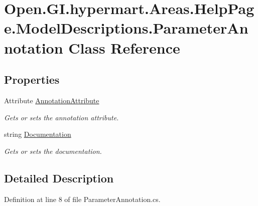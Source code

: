 \hypertarget{class_open_1_1_g_i_1_1hypermart_1_1_areas_1_1_help_page_1_1_model_descriptions_1_1_parameter_annotation}{}\section{Open.\+G\+I.\+hypermart.\+Areas.\+Help\+Page.\+Model\+Descriptions.\+Parameter\+Annotation Class Reference}
\label{class_open_1_1_g_i_1_1hypermart_1_1_areas_1_1_help_page_1_1_model_descriptions_1_1_parameter_annotation}


 


\subsection*{Properties}
\begin{DoxyCompactItemize}
\item 
Attribute \hyperlink{class_open_1_1_g_i_1_1hypermart_1_1_areas_1_1_help_page_1_1_model_descriptions_1_1_parameter_annotation_a53e191aedff647b1d7cd63e2bb2219e0}{Annotation\+Attribute}
\begin{DoxyCompactList}\small\item\em Gets or sets the annotation attribute. \end{DoxyCompactList}\item 
string \hyperlink{class_open_1_1_g_i_1_1hypermart_1_1_areas_1_1_help_page_1_1_model_descriptions_1_1_parameter_annotation_a9bfcc6f5d41c3630187373bbf9993fa4}{Documentation}
\begin{DoxyCompactList}\small\item\em Gets or sets the documentation. \end{DoxyCompactList}\end{DoxyCompactItemize}


\subsection{Detailed Description}




Definition at line 8 of file Parameter\+Annotation.\+cs.



